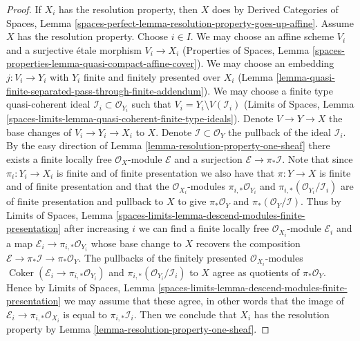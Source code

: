 \documentclass[10pt,a4paper]{amsart}
\theoremstyle{plain}
\theoremstyle{definition}
\theoremstyle{remark}
\numberwithin{equation}{subsection}
\def\Coker{\mathop{\mathrm{Coker}}}
\begin{document}
\begin{proof}
If $X_i$ has the resolution property, then $X$ does by
Derived Categories of Spaces, Lemma
\ref{spaces-perfect-lemma-resolution-property-goes-up-affine}.
Assume $X$ has the resolution property.
Choose $i \in I$. We may choose an affine scheme $V_i$ and a surjective
\'etale morphism $V_i \to X_i$ 
(Properties of Spaces, Lemma
\ref{spaces-properties-lemma-quasi-compact-affine-cover}).
We may choose an embedding $j : V_i \to Y_i$
with $Y_i$ finite and finitely presented over $X_i$
(Lemma \ref{lemma-quasi-finite-separated-pass-through-finite-addendum}).
We may choose a finite type
quasi-coherent ideal $\mathcal{I}_i \subset \mathcal{O}_{Y_i}$
such that $V_i = Y_i \setminus V(\mathcal{I}_i)$
(Limits of Spaces, Lemma
\ref{spaces-limits-lemma-quasi-coherent-finite-type-ideals}).
Denote $V \to Y \to X$ the base changes of $V_i \to Y_i \to X_i$
to $X$. Denote $\mathcal{I} \subset \mathcal{O}_Y$ the pullback
of the ideal $\mathcal{I}_i$. By the easy direction of
Lemma \ref{lemma-resolution-property-one-sheaf}
there exists a finite locally free $\mathcal{O}_X$-module
$\mathcal{E}$ and a surjection $\mathcal{E} \to \pi_*\mathcal{I}$.
Note that since $\pi_i : Y_i \to X_i$ is finite and of finite presentation
we also have that $\pi : Y \to X$ is finite and of finite presentation
and that the $\mathcal{O}_{X_i}$-modules
$\pi_{i, *}\mathcal{O}_{Y_i}$ and
$\pi_{i, *}(\mathcal{O}_{Y_i}/\mathcal{I}_i)$
are of finite presentation and pullback to $X$ to give
$\pi_*\mathcal{O}_Y$ and
$\pi_*(\mathcal{O}_Y/\mathcal{I})$. Thus by Limits of Spaces, Lemma
\ref{spaces-limits-lemma-descend-modules-finite-presentation}
after increasing $i$ we can find a finite locally free
$\mathcal{O}_{X_i}$-module $\mathcal{E}_i$
and a map $\mathcal{E}_i \to \pi_{i, *}\mathcal{O}_{Y_i}$
whose base change to $X$ recovers the composition
$\mathcal{E} \to \pi_*\mathcal{I} \to \pi_*\mathcal{O}_Y$.
The pullbacks of the finitely presented $\mathcal{O}_{X_i}$-modules
$\Coker(\mathcal{E}_i \to \pi_{i, *}\mathcal{O}_{Y_i})$
and $\pi_{i, *}(\mathcal{O}_{Y_i}/\mathcal{I}_i)$
to $X$ agree as quotients of $\pi_*\mathcal{O}_Y$.
Hence by Limits of Spaces, Lemma
\ref{spaces-limits-lemma-descend-modules-finite-presentation}
we may assume that these agree, in other words that
the image of $\mathcal{E}_i \to \pi_{i, *}\mathcal{O}_{X_i}$
is equal to $\pi_{i, *}\mathcal{I}_i$.
Then we conclude that $X_i$ has the resolution property by
Lemma \ref{lemma-resolution-property-one-sheaf}.
\end{proof}
\end{document}

